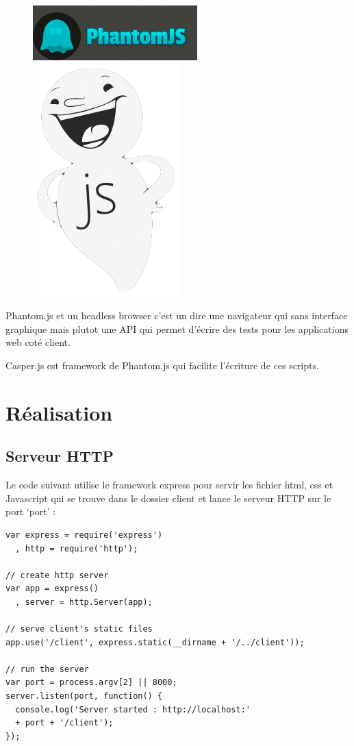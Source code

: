 \documentclass[a4paper]{article}
\begin{document}
\begin{figure}[H]
  \begin{center}
  \includegraphics[scale=0.5]{phantomjs.png}
  \includegraphics[scale=0.2]{casperjs.png}
  \end{center}
\end{figure}

Phantom.js et un headless browser c'est un dire une navigateur qui sans interface
graphique mais plutot une API qui permet d'écrire des tests pour les applications
web coté client.

Casper.js est framework de Phantom.js qui facilite l'écriture de ces scripts.

\section{Réalisation}

\subsection{Serveur HTTP}

Le code suivant utilise le framework express pour servir les fichier html, css et Javascript
qui se trouve dans le dossier client
et lance le serveur HTTP sur le port `port' : 

\begin{lstlisting}
var express = require('express')
  , http = require('http');

// create http server
var app = express()
  , server = http.Server(app);

// serve client's static files
app.use('/client', express.static(__dirname + '/../client'));

// run the server
var port = process.argv[2] || 8000;
server.listen(port, function() {
  console.log('Server started : http://localhost:' 
  + port + '/client');
});
\end{lstlisting}
\end{document}

